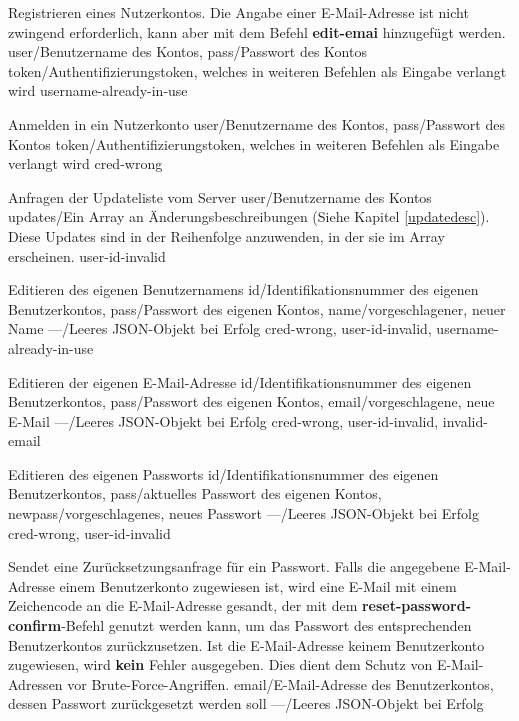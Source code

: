 \documentclass[parskip=full,11pt]{scrartcl}
\begin{document}
{Registrieren eines Nutzerkontos. Die Angabe einer E-Mail-Adresse ist nicht
zwingend erforderlich, kann aber mit dem Befehl \textbf{edit-emai} hinzugefügt
werden.}
{user/Benutzername des Kontos,
pass/Passwort des Kontos}
{token/Authentifizierungstoken{,} welches in weiteren Befehlen
als Eingabe verlangt wird}
{username-already-in-use}

{Anmelden in ein Nutzerkonto}
{user/Benutzername des Kontos,
pass/Passwort des Kontos}
{token/Authentifizierungstoken{,} welches in weiteren Befehlen
als Eingabe verlangt wird}
{cred-wrong}

{Anfragen der Updateliste vom Server}
{user/Benutzername des Kontos}
{updates/Ein Array an Änderungsbeschreibungen (Siehe Kapitel \ref{updatedesc}).
Diese Updates sind in der Reihenfolge anzuwenden{,} in der sie im Array
erscheinen.}
{user-id-invalid}

{Editieren des eigenen Benutzernamens}
{id/Identifikationsnummer des eigenen Benutzerkontos,
pass/Passwort des eigenen Kontos,
name/vorgeschlagener{,} neuer Name}
{---/Leeres JSON-Objekt bei Erfolg}
{cred-wrong, user-id-invalid, username-already-in-use}

{Editieren der eigenen E-Mail-Adresse}
{id/Identifikationsnummer des eigenen Benutzerkontos,
pass/Passwort des eigenen Kontos,
email/vorgeschlagene{,} neue E-Mail}
{---/Leeres JSON-Objekt bei Erfolg}
{cred-wrong, user-id-invalid, invalid-email}\

{Editieren des eigenen Passworts}
{id/Identifikationsnummer des eigenen Benutzerkontos,
pass/aktuelles Passwort des eigenen Kontos,
newpass/vorgeschlagenes{,} neues Passwort}
{---/Leeres JSON-Objekt bei Erfolg}
{cred-wrong, user-id-invalid}

{Sendet eine Zurücksetzungsanfrage für ein Passwort.
Falls die angegebene E-Mail-Adresse einem Benutzerkonto zugewiesen ist, wird
eine E-Mail mit einem Zeichencode an die E-Mail-Adresse gesandt, der mit dem
\textbf{reset-password-confirm}-Befehl genutzt werden kann, um das Passwort des
entsprechenden Benutzerkontos zurückzusetzen.
Ist die E-Mail-Adresse keinem Benutzerkonto zugewiesen, wird \textbf{kein}
Fehler ausgegeben.
Dies dient dem Schutz von E-Mail-Adressen vor Brute-Force-Angriffen.}
{email/E-Mail-Adresse des Benutzerkontos{,} dessen Passwort zurückgesetzt werden
soll}
{---/Leeres JSON-Objekt bei Erfolg}
{}
\end{document}
